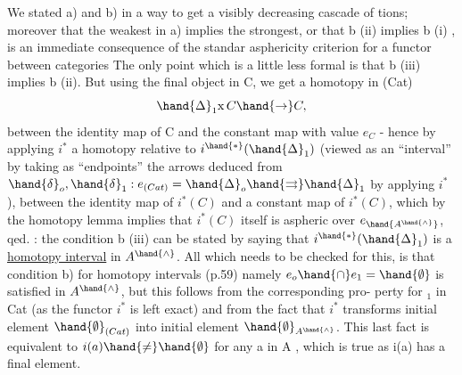 We stated a) and b) in a way to get a visibly decreasing cascade of
tions;  moreover that the weakest in a) implies the strongest,  or
that b (ii) implies b (i) , is an immediate consequence of the standar
asphericity criterion for a functor between categories  The only point
which is a little less formal is that  b (iii)  implies b (ii).  But
using the final object in C,  we get a  homotopy  in (Cat) 
\[ \hand{\ensuremath{\Delta}}_1 \mathrm{x}\, C \hand{\rightarrow} C , \]
between the identity map of C and the constant map with value $e_C$  - hence
by applying $i^{*}$\hand{,} a homotopy  relative to  $i^{\hand{*}}(\hand{\ensuremath{\Delta}}_1)$  (viewed as an ``interval''
by taking as ``endpoints'' the arrows deduced from $\hand{\ensuremath{\delta}}_o,\hand{\ensuremath{\delta}}_1 : e_{(Cat)} = \hand{\ensuremath{\Delta}}_o \hand{\ensuremath{\rightrightarrows}} \hand{\ensuremath{\Delta}}_1$
by applying $i^{*}$ ),  between the identity map of $i^{*}(C)$ and a constant map
of $i^{*}(C)$,  which by the  homotopy lemma implies that $i^{*}(C)$ itself is
aspheric over $e_{\hand{\ensuremath{A^{\hand{\wedge}}}}}$,  qed.
:    the condition  b (iii) can be stated by saying that $i^{\hand{*}}(\hand{\ensuremath{\Delta}}_1)$
is a \uline{homotopy interval} in $A^{\hand{\wedge}}$.  All which needs to be checked for this, is
that  condition  b) for homotopy intervals  (p.59) namely $e_o \hand{\ensuremath{\cap}} e_1 = \hand{\emptyset}$  is
satisfied in $A^{\hand{\wedge}}$,  but this follows from the corresponding  pro-%
perty for \hand{\ensuremath{\Delta}}$_1$ in Cat (as the functor $i^{*}$ is left exact) and from the fact
that $i^{*}$ transforms initial element $\hand{\emptyset}_{(Cat)}$ into initial element $\hand{\emptyset}_{A^{\hand{\wedge}}}$.  This
last fact is equivalent to $i(a) \hand{\neq} \hand{\emptyset}$ for any a in A , which is true as
i(a) has a final element.

